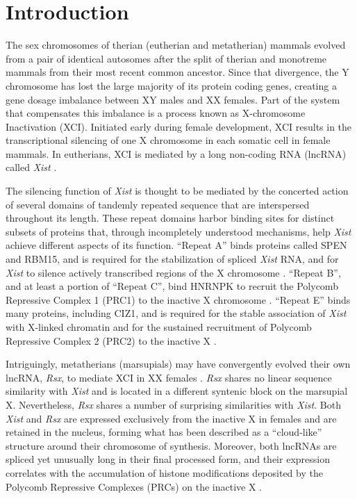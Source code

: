 \section{Introduction}
The sex chromosomes of therian (eutherian and metatherian) mammals evolved from a pair of identical autosomes after the split of therian and monotreme mammals from their most recent common ancestor. Since that divergence, the Y chromosome has lost the large majority of its protein coding genes, creating a gene dosage imbalance between XY males and XX females. Part of the system that compensates this imbalance is a process known as X-chromosome Inactivation (XCI). Initiated early during female development, XCI results in the transcriptional silencing of one X chromosome in each somatic cell in female mammals. In eutherians, XCI is mediated by a long non-coding RNA (lncRNA) called \textit{\emph{Xist}} \cite{Balaton2018TheChromosome,Brockdorff2018LocalNcRNA,DaRocha2017NovelConformation,Sahakyan2018TheCompensation}. 

The silencing function of \textit{\emph{Xist}} is thought to be mediated by the concerted action of several domains of tandemly repeated sequence that are interspersed throughout its length. These repeat domains harbor binding sites for distinct subsets of proteins that, through incompletely understood mechanisms, help \textit{\emph{Xist}} achieve different aspects of its function. “Repeat A” binds proteins called SPEN and RBM15, and is required for the stabilization of spliced \textit{\emph{Xist}} RNA, and for \emph{Xist} to silence actively transcribed regions of the X chromosome \cite{Chu2015SystematicProteins,Engreitz2013TheChromosome, Hoki2009AMouse,McHugh2015TheHDAC3, Moindrot2015ASilencing, Patil2016M6Repression,Royce-Tolland2010TheInactivation,Wutz2002ChromosomalRNA}. “Repeat B”, and at least a portion of “Repeat C”, bind HNRNPK to recruit the Polycomb Repressive Complex 1 (PRC1) to the inactive X chromosome \cite{Almeida2017PCGF3/5-PRC1Inactivation,Pintacuda2017HnRNPKSilencing}. “Repeat E” binds many proteins, including CIZ1, and is required for the stable association of \emph{Xist} with X-linked chromatin and for the sustained recruitment of Polycomb Repressive Complex 2 (PRC2) to the inactive X  \cite{Ridings-Figueroa2017TheTerritory,Smola2016SHAPECells,Sunwoo2017RepeatCIZ1}.

Intriguingly, metatherians (marsupials) may have convergently evolved their own lncRNA, \emph{Rsx}, to mediate XCI in XX females \cite{Grant2012RsxInactivation}. \emph{Rsx} shares no linear sequence similarity with \textit{\emph{Xist}} and is located in a different syntenic block on the marsupial X. Nevertheless, \emph{Rsx} shares a number of surprising similarities with \emph{Xist}. Both \emph{Xist} and \emph{Rsx} are expressed exclusively from the inactive X in females and are retained in the nucleus, forming what has been described as a “cloud-like” structure around their chromosome of synthesis. Moreover, both lncRNAs are spliced yet unusually long in their final processed form, and their expression correlates with the accumulation of histone modifications deposited by the Polycomb Repressive Complexes (PRCs) on the inactive X \cite{Grant2012RsxInactivation}. 

